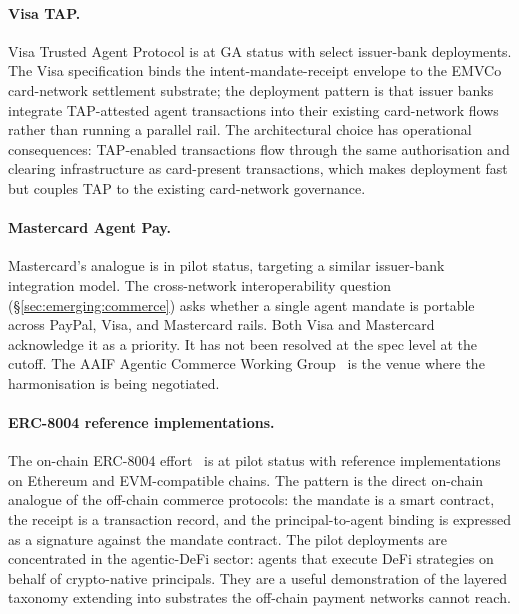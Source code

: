 \paragraph{Visa TAP.}
Visa Trusted Agent Protocol is at GA status with select
issuer-bank deployments. The Visa specification binds the
intent-mandate-receipt envelope to the EMVCo card-network
settlement substrate; the deployment pattern is that
issuer banks integrate TAP-attested agent transactions
into their existing card-network flows rather than
running a parallel rail. The architectural choice has
operational consequences: TAP-enabled transactions
flow through the same authorisation and clearing
infrastructure as card-present transactions, which makes
deployment fast but couples TAP to the existing
card-network governance.

\paragraph{Mastercard Agent Pay.}
Mastercard's analogue is in pilot status, targeting a
similar issuer-bank integration model. The cross-network
interoperability question
(\S\ref{sec:emerging:commerce}) asks whether a single
agent mandate is portable across PayPal, Visa, and
Mastercard rails. Both Visa and Mastercard acknowledge
it as a priority. It has not been resolved at
the spec level at the cutoff. The AAIF Agentic Commerce
Working Group~\cite{lf_aaif} is the venue where the
harmonisation is being negotiated.

\paragraph{ERC-8004 reference implementations.}
The on-chain ERC-8004 effort~\cite{spec_erc8004} is at
pilot status with reference implementations on
Ethereum and EVM-compatible chains. The pattern is the
direct on-chain analogue of the off-chain commerce
protocols: the mandate is a smart contract, the receipt
is a transaction record, and the principal-to-agent
binding is expressed as a signature against the
mandate contract. The pilot deployments are concentrated
in the agentic-DeFi sector: agents that execute DeFi
strategies on behalf of crypto-native principals. They
are a useful demonstration of the layered taxonomy
extending into substrates the off-chain payment networks
cannot reach.

